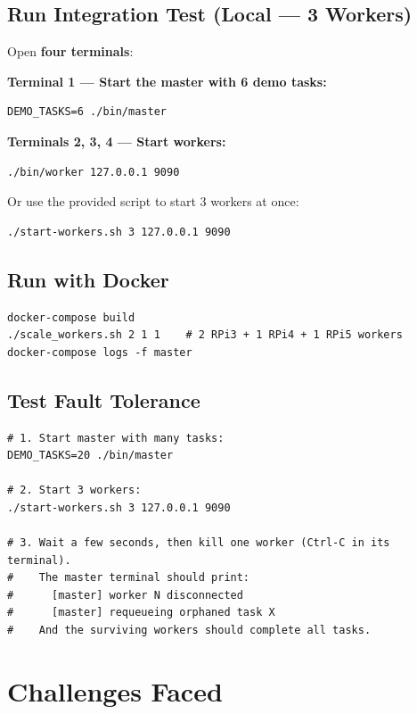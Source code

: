 \documentclass[12pt,a4paper]{article}
\begin{document}
\subsection{Run Integration Test (Local --- 3 Workers)}
Open \textbf{four terminals}:

\textbf{Terminal 1 --- Start the master with 6 demo tasks:}
\begin{lstlisting}[style=shellstyle]
DEMO_TASKS=6 ./bin/master
\end{lstlisting}

\textbf{Terminals 2, 3, 4 --- Start workers:}
\begin{lstlisting}[style=shellstyle]
./bin/worker 127.0.0.1 9090
\end{lstlisting}

Or use the provided script to start 3 workers at once:
\begin{lstlisting}[style=shellstyle]
./start-workers.sh 3 127.0.0.1 9090
\end{lstlisting}

\subsection{Run with Docker}
\begin{lstlisting}[style=shellstyle]
docker-compose build
./scale_workers.sh 2 1 1    # 2 RPi3 + 1 RPi4 + 1 RPi5 workers
docker-compose logs -f master
\end{lstlisting}

\subsection{Test Fault Tolerance}
\begin{lstlisting}[style=shellstyle]
# 1. Start master with many tasks:
DEMO_TASKS=20 ./bin/master

# 2. Start 3 workers:
./start-workers.sh 3 127.0.0.1 9090

# 3. Wait a few seconds, then kill one worker (Ctrl-C in its terminal).
#    The master terminal should print:
#      [master] worker N disconnected
#      [master] requeueing orphaned task X
#    And the surviving workers should complete all tasks.
\end{lstlisting}

\section{Challenges Faced}
\end{document}
